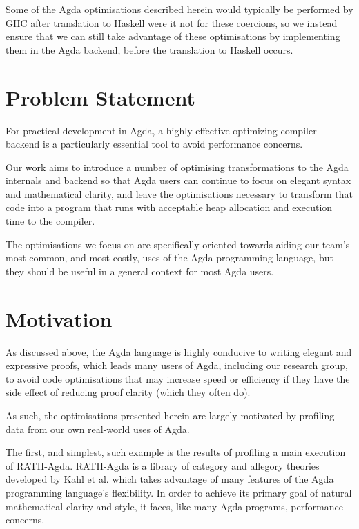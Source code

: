 Some of the Agda optimisations described herein would typically be performed by GHC after translation to Haskell were it not for these coercions, so we instead ensure that we can still take advantage of these optimisations by implementing them in the Agda backend, before the translation to Haskell occurs.

\section{Problem Statement}
\label{sec:problem_statement}

For practical development in Agda, a highly effective optimizing compiler backend is a particularly essential tool to avoid performance concerns.

Our work aims to introduce a number of optimising transformations to the Agda internals and backend so that Agda users can continue to focus on elegant syntax and mathematical clarity, and leave the optimisations necessary to transform that code into a program that runs with acceptable heap allocation and execution time to the compiler.

The optimisations we focus on are specifically oriented towards aiding our team's most common, and most costly, uses of the Agda programming language, but they should be useful in a general context for most Agda users.

\section{Motivation}
\label{sec:motivation}

As discussed above, the Agda language is highly conducive to writing elegant and expressive proofs, which leads many users of Agda, including our research group, to avoid code optimisations that may increase speed or efficiency if they have the side effect of reducing proof clarity (which they often do).

As such, the optimisations presented herein are largely motivated by profiling data from our own real-world uses of Agda.

The first, and simplest, such example is the results of profiling a main execution of RATH-Agda. RATH-Agda is a library of category and allegory theories developed by Kahl et al. which takes advantage of many features of the Agda programming language's flexibility.\cite{kahl2017} In order to achieve its primary goal of natural mathematical clarity and style, it faces, like many Agda programs, performance concerns.


